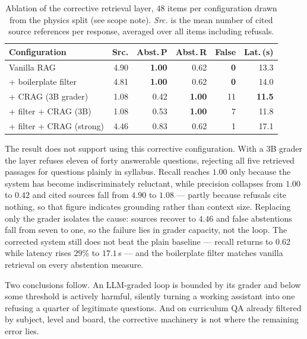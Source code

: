 \documentclass[conference]{IEEEtran}
\begin{document}
\begin{table}[htbp]
\caption{Ablation of the corrective retrieval layer, $48$ items per
configuration drawn from the physics split (see scope note).
\emph{Src.} is the mean number of cited source references per response,
averaged over all items including refusals.}
\label{tab:ablation}
\centering
\small
\setlength{\tabcolsep}{4pt}
\begin{tabular}{lrrrrr}
\toprule
\textbf{Configuration} & \textbf{Src.} & \textbf{Abst.\,P} & \textbf{Abst.\,R} & \textbf{False} & \textbf{Lat.\,(s)} \\
\midrule
Vanilla RAG              & 4.90 & \textbf{1.00} & 0.62 & \textbf{0}  & 13.3 \\
+ boilerplate filter     & 4.81 & \textbf{1.00} & 0.62 & \textbf{0}  & 14.0 \\
+ CRAG ($3$B grader)     & 1.08 & 0.42 & \textbf{1.00} & 11 & \textbf{11.5} \\
+ filter + CRAG ($3$B)   & 1.08 & 0.53 & \textbf{1.00} & 7  & 11.8 \\
+ filter + CRAG (strong) & 4.46 & 0.83 & 0.62 & 1  & 17.1 \\
\bottomrule
\end{tabular}
\end{table}

The result does not support using this corrective configuration. With a $3$B
grader the layer refuses eleven of forty answerable questions, rejecting all
five retrieved passages for questions plainly in syllabus. Recall reaches
$1.00$ only because the system has become indiscriminately reluctant, while
precision collapses from $1.00$ to $0.42$ and cited sources fall from $4.90$ to
$1.08$ --- partly because refusals cite nothing, so that figure indicates
grounding rather than context size. Replacing only the grader isolates the
cause: sources recover to $4.46$ and false abstentions fall from seven to one,
so the failure lies in grader capacity, not the loop. The corrected system
still does not beat the plain baseline --- recall returns to $0.62$ while
latency rises $29\%$ to $17.1$\,s --- and the boilerplate filter matches vanilla
retrieval on every abstention measure.

Two conclusions follow. An LLM-graded loop is bounded by its grader and below
some threshold is actively harmful, silently turning a working assistant into
one refusing a quarter of legitimate questions. And on curriculum QA already
filtered by subject, level and board, the corrective machinery is not where the
remaining error lies.
\end{document}
